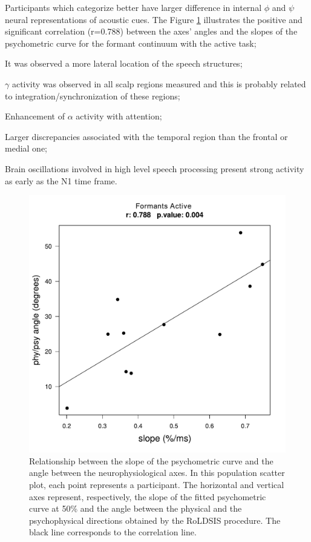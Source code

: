\begin{itemize*} 
\item Participants which categorize better have larger
 difference in internal $\phi$ and $\psi$ neural representations of acoustic
 cues. The Figure \ref{formAct} illustrates the positive and significant
 correlation (r=0.788) between the axes' angles and the slopes of the
 psychometric curve for the formant continuum with the active task; \item It
 was observed a more lateral location of the speech structures;
\item $\gamma$ activity was observed in all scalp regions measured and this is
 probably related to integration/synchronization of these regions; \item
 Enhancement of $\alpha$ activity with attention; \item Larger discrepancies
 associated with the temporal region than the frontal or medial one; \item
 Brain oscillations involved in high level speech processing present strong
 activity as early as the N1 time frame.
\end{itemize*}

\begin{figure}
\centering
\includegraphics[width=\linewidth]{imgs/Formantes-Ativo-slope-angle.pdf}
\caption{Relationship between the slope of the psychometric
curve and the angle between the neurophysiological axes. In this
population scatter plot, each point represents a participant. The
horizontal and vertical axes represent, respectively, the slope of
the fitted psychometric curve at 50\% and the angle between the
physical and the psychophysical directions obtained by the RoLDSIS
procedure. The black line corresponds to the correlation line.}
\label{formAct}
\end{figure}



